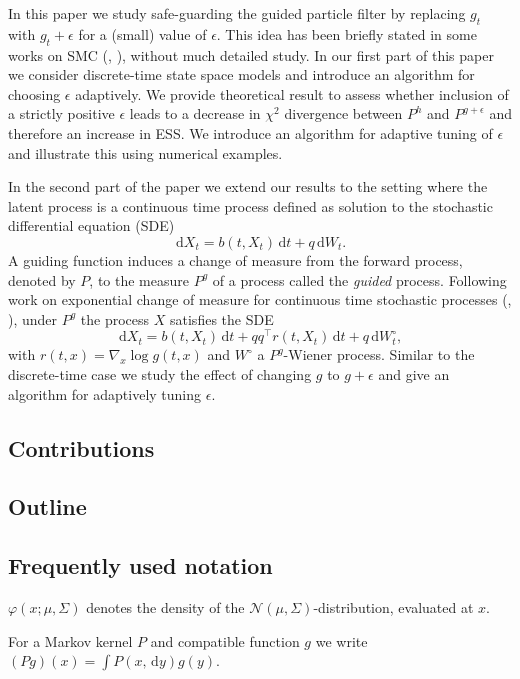\documentclass[11pt,reqno]{amsart}
\newcommand{\dd}{{\,\mathrm d}}
\renewcommand{\phi}{\varphi}
\renewcommand{\scr}[1]{{\mathcal #1}}
\newcommand{\T}{{\top}}
\theoremstyle{definition}
\begin{document}
In this paper we study safe-guarding the guided particle filter by replacing $g_t$ with $g_t + \epsilon$ for a (small) value of $\epsilon$. This idea has been briefly stated in some works on SMC (\cite{Guarniero2017}, \cite{Lindsten2018graphical}), without much detailed study. In our first part of this paper we consider discrete-time state space models and introduce an algorithm for choosing $\epsilon$ adaptively. We provide theoretical result to assess whether inclusion of a strictly positive $\epsilon$ leads to a decrease in $\chi^2$ divergence between $P^h$ and $P^{g+\epsilon}$ and therefore an increase in ESS. We introduce an algorithm for adaptive tuning of $\epsilon$ and  illustrate this using numerical examples. 

In the second part of the paper we extend our results to the setting where the latent process is a continuous time process defined as solution to the stochastic differential equation (SDE)
\[ \dd X_t = b(t,X_t) \dd t+ q \dd W_t. \]
A guiding function induces a change of measure from the forward process,  denoted by $P$, to the measure $P^g$ of a process called the {\it guided} process. Following  work on exponential change of measure for continuous time stochastic processes (\cite{PalmowskiRolski2002}, \cite{BFFG}), under $P^g$ the process $X$ satisfies the SDE
 \[ \dd X_t = b(t,X_t) \dd t+ qq^\T r(t,X_t) \dd t + q \dd W^\circ_t, \]
with $r(t,x)=\nabla_x \log g(t,x)$ and $W^\circ$ a $P^g$-Wiener process. Similar to the discrete-time case we study the effect of changing $g$ to $g+\epsilon$ and give an algorithm for adaptively tuning $\epsilon$. 



\subsection{Contributions}


\subsection{Outline}

\subsection{Frequently used notation}
 $\phi(x;\mu,\Sigma)$ denotes the  density of the $\scr{N}(\mu, \Sigma)$-distribution, evaluated at $x$.

For a Markov kernel $P$ and compatible function $g$ we write $(P g)(x)= \int P(x,\dd y) g(y)$. 
\end{document}
